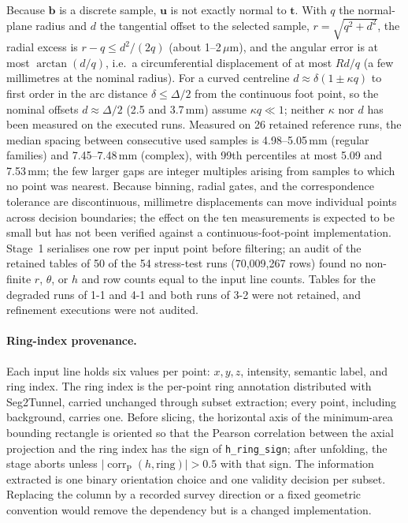 \documentclass[a4paper,fleqn]{cas-dc}
\begin{document}
Because $\mathbf b$ is a discrete sample, $\mathbf u$ is not exactly normal to $\mathbf t$. With $q$ the normal-plane radius and $d$ the tangential offset to the selected sample, $r=\sqrt{q^2+d^2}$, the radial excess is $r-q\le d^2/(2q)$ (about 1--2\,$\mu$m), and the angular error is at most $\arctan(d/q)$, i.e.\ a circumferential displacement of at most $Rd/q$ (a few millimetres at the nominal radius). For a curved centreline $d\approx\delta(1\pm\kappa q)$ to first order in the arc distance $\delta\le\Delta/2$ from the continuous foot point, so the nominal offsets $d\approx\Delta/2$ (2.5 and 3.7\,mm) assume $\kappa q\ll1$; neither $\kappa$ nor $d$ has been measured on the executed runs. Measured on 26 retained reference runs, the median spacing between consecutive used samples is 4.98--5.05\,mm (regular families) and 7.45--7.48\,mm (complex), with 99th percentiles at most 5.09 and 7.53\,mm; the few larger gaps are integer multiples arising from samples to which no point was nearest. Because binning, radial gates, and the correspondence tolerance are discontinuous, millimetre displacements can move individual points across decision boundaries; the effect on the ten measurements is expected to be small but has not been verified against a continuous-foot-point implementation. Stage~1 serialises one row per input point before filtering; an audit of the retained tables of 50 of the 54 stress-test runs (70{,}009{,}267 rows) found no non-finite $r$, $\theta$, or $h$ and row counts equal to the input line counts. Tables for the degraded runs of 1-1 and 4-1 and both runs of 3-2 were not retained, and refinement executions were not audited.

\paragraph{Ring-index provenance.}
Each input line holds six values per point: $x,y,z$, intensity, semantic label, and ring index. The ring index is the per-point ring annotation distributed with Seg2Tunnel, carried unchanged through subset extraction; every point, including background, carries one. Before slicing, the horizontal axis of the minimum-area bounding rectangle is oriented so that the Pearson correlation between the axial projection and the ring index has the sign of \texttt{h\_ring\_sign}; after unfolding, the stage aborts unless $|\operatorname{corr}_{\mathrm P}(h,\text{ring})|>0.5$ with that sign. The information extracted is one binary orientation choice and one validity decision per subset. Replacing the column by a recorded survey direction or a fixed geometric convention would remove the dependency but is a changed implementation.
\end{document}
